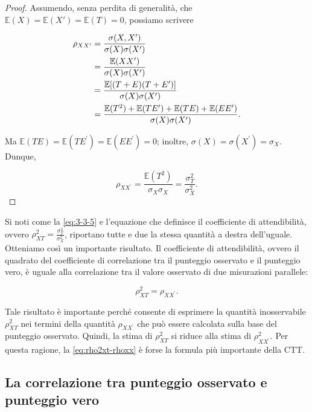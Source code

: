 \documentclass[
  11pt,
]{krantz}
\newcommand{\E}{\mathbb{E}} %
\theoremstyle{definition}
\theoremstyle{definition}
\theoremstyle{definition}
\theoremstyle{definition}
\theoremstyle{remark}
\begin{document}
\begin{proof}
Assumendo, senza perdita di generalità, che \(\E(X)=\E(X')=\E(T)=0\), possiamo scrivere

\begin{equation}
\begin{aligned}
\rho_{X X^\prime} &= \frac{\sigma(X, X^\prime)}{\sigma(X) \sigma(X^\prime)}\notag\\
&= \frac{\E(XX^\prime)}{\sigma(X) \sigma(X^\prime)}\notag\\
&=\frac{\E[(T+E)(T+E^\prime)]}{\sigma(X) \sigma(X^\prime)}\notag\\
&=\frac{\E(T^2)+\E(TE^\prime)+\E(TE)+ \E(EE^\prime)}{\sigma(X) \sigma(X^\prime)}.\notag
\end{aligned}
\end{equation}

Ma \(\E(TE) = \E(TE^\prime) = \E(EE^\prime)=0\); inoltre, \(\sigma(X) =\sigma(X^\prime)= \sigma_X\). Dunque,

\begin{equation}
\rho_{X X^\prime} =\frac{\E(T^2)}{\sigma_X \sigma_X} = \frac{\sigma^2_T}{\sigma^2_X}.
\label{eq:3-3-5}
\end{equation}
\end{proof}

Si noti come la \eqref{eq:3-3-5} e l'equazione che definisce il coefficiente di attendibilità, ovvero \(\rho_{XT}^2 = \frac{\sigma_{T}^2}{\sigma_X^2}\), riportano tutte e due la stessa quantità a destra dell'uguale. Otteniamo così un importante risultato. Il coefficiente di attendibilità, ovvero il quadrato del coefficiente di correlazione tra il punteggio osservato e il punteggio vero, è uguale alla correlazione tra il valore osservato di due misurazioni parallele:

\begin{equation}
\rho^2_{XT} =  \rho_{XX^\prime}.
\label{eq:rho2xt-rhoxx}
\end{equation}

Tale risultato è importante perché consente di esprimere la quantità inosservabile \(\rho^2_{XT}\) nei termini della quantità \(\rho_{XX^\prime}\) che può essere calcolata sulla base del punteggio osservato. Quindi, la stima di \(\rho^2_{XT}\) si riduce alla stima di \(\rho^2_{XX^\prime}\). Per questa ragione, la \eqref{eq:rho2xt-rhoxx} è forse la formula più importante della CTT.

\hypertarget{la-correlazione-tra-punteggio-osservato-e-punteggio-vero}{%
\subsection{La correlazione tra punteggio osservato e punteggio vero}\label{la-correlazione-tra-punteggio-osservato-e-punteggio-vero}}
\end{document}
